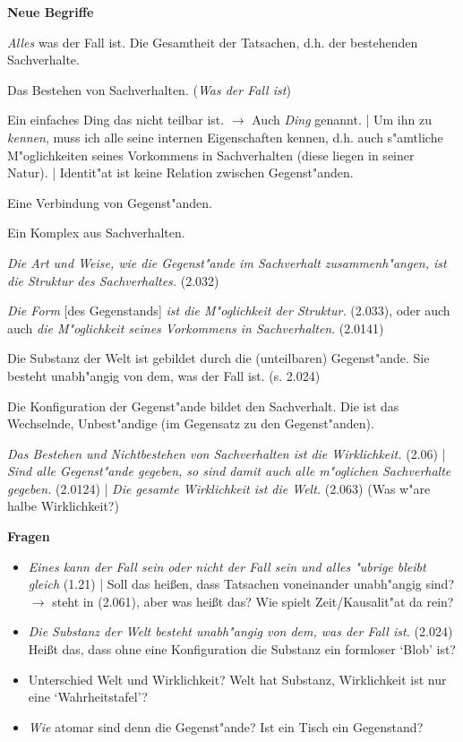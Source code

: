 \documentclass[]{scrartcl}
\begin{document}
\vspace{10pt}
\textbf{Neue Begriffe}

\begin{description}[leftmargin=!,labelwidth=\widthof{\bfseries Konfiguration}]
  \item[Welt] \emph{Alles} was der Fall ist. Die Gesamtheit der Tatsachen, d.h. der bestehenden Sachverhalte.
  \item[Tatsache] Das Bestehen von Sachverhalten. (\emph{Was der Fall ist})
  \item[Gegenstand] Ein einfaches Ding das nicht teilbar ist. $\rightarrow$ Auch \emph{Ding} genannt. | Um ihn zu \emph{kennen}, muss ich alle seine internen Eigenschaften kennen, d.h. auch s"amtliche M"oglichkeiten seines Vorkommens in Sachverhalten (diese liegen in seiner Natur). | Identit"at ist keine Relation zwischen Gegenst"anden.
  \item[Sachverhalt] Eine Verbindung von Gegenst"anden.
  \item[Sachlage] Ein Komplex aus Sachverhalten.
  \item[Struktur] \emph{Die Art und Weise, wie die Gegenst"ande im Sachverhalt zusammenh"angen, ist die Struktur des Sachverhaltes.} (2.032)
  \item[Form] \emph{Die Form} [des Gegenstands] \emph{ist die M"oglichkeit der Struktur.} (2.033), oder auch auch \emph{die M"oglichkeit seines Vorkommens in Sachverhalten}. (2.0141)
  \item[Substanz] Die Substanz der Welt ist gebildet durch die (unteilbaren) Gegenst"ande. Sie besteht unabh"angig von dem, was der Fall ist. (s. 2.024)
  \item[Konfiguration] Die Konfiguration der Gegenst"ande bildet den Sachverhalt. Die ist das Wechselnde, Unbest"andige (im Gegensatz zu den Gegenst"anden).
  \item[Wirklichkeit] \emph{Das Bestehen und Nichtbestehen von Sachverhalten ist die Wirklichkeit.} (2.06) | \emph{Sind alle Gegenst"ande gegeben, so sind damit auch alle m"oglichen Sachverhalte gegeben.} (2.0124) | \emph{Die gesamte Wirklichkeit ist die Welt.} (2.063) {\color{red}(Was w"are halbe Wirklichkeit?)}
\end{description}

\textbf{Fragen}

\begin{itemize}
  \item \emph{Eines kann der Fall sein oder nicht der Fall sein und alles "ubrige bleibt gleich} (1.21) | Soll das hei\ss en, dass Tatsachen voneinander unabh"angig sind? $\rightarrow$ steht in (2.061), aber was hei\ss t das? Wie spielt Zeit/Kausalit"at da rein?
  \item \emph{Die Substanz der Welt besteht unabh"angig von dem, was der Fall ist.} (2.024) Hei\ss t das, dass ohne eine Konfiguration die Substanz ein formloser `Blob' ist?
  \item Unterschied Welt und Wirklichkeit? Welt hat Substanz, Wirklichkeit ist nur eine `Wahrheitstafel'? 
  \item \emph{Wie} atomar sind denn die Gegenst"ande? Ist ein Tisch ein Gegenstand?
\end{itemize}
\end{document}
